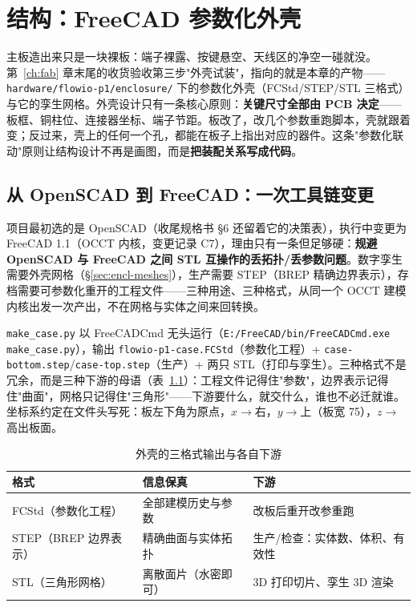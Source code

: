 \chapter{结构：FreeCAD 参数化外壳}
\label{ch:enclosure}

主板造出来只是一块裸板：端子裸露、按键悬空、天线区的净空一碰就没。第~\ref{ch:fab} 章末尾的收货验收第三步"外壳试装"，指向的就是本章的产物——\texttt{hardware/flowio-p1/enclosure/} 下的参数化外壳（FCStd/STEP/STL 三格式）与它的孪生网格。外壳设计只有一条核心原则：\textbf{关键尺寸全部由 PCB 决定}——板框、铜柱位、连接器坐标、端子节距。板改了，改几个参数重跑脚本，壳就跟着变；反过来，壳上的任何一个孔，都能在板子上指出对应的器件。这条"参数化联动"原则让结构设计不再是画图，而是\textbf{把装配关系写成代码}。

\section{从 OpenSCAD 到 FreeCAD：一次工具链变更}
\label{sec:encl-freecad}

项目最初选的是 OpenSCAD（收尾规格书 \S6 还留着它的决策表），执行中变更为 FreeCAD 1.1（OCCT 内核，变更记录 C7），理由只有一条但足够硬：\textbf{规避 OpenSCAD 与 FreeCAD 之间 STL 互操作的丢拓扑/丢参数问题}。数字孪生需要外壳网格（\S\ref{sec:encl-meshes}），生产需要 STEP（BREP 精确边界表示），存档需要可参数化重开的工程文件——三种用途、三种格式，从同一个 OCCT 建模内核出发一次产出，不在网格与实体之间来回转换。

\texttt{make\_case.py} 以 FreeCADCmd 无头运行（\texttt{E:/FreeCAD/bin/FreeCADCmd.exe make\_case.py}），输出 \texttt{flowio-p1-case.FCStd}（参数化工程）+ \texttt{case-bottom.step}/\texttt{case-top.step}（生产）+ 两只 STL（打印与孪生）。三种格式不是冗余，而是三种下游的母语（表~\ref{tab:encl-formats}）：工程文件记得住"参数"，边界表示记得住"曲面"，网格只记得住"三角形"——下游要什么，就交什么，谁也不必迁就谁。坐标系约定在文件头写死：板左下角为原点，$x\to$右，$y\to$上（板宽 75），$z\to$高出板面。

\begin{table}[htbp]
  \centering
  \caption{外壳的三格式输出与各自下游}
  \label{tab:encl-formats}
  \begin{tabular}{llp{4.4cm}}
    \toprule
    格式 & 信息保真 & 下游 \\
    \midrule
    FCStd（参数化工程） & 全部建模历史与参数 & 改板后重开改参重跑 \\
    STEP（BREP 边界表示） & 精确曲面与实体拓扑 & 生产/检查：实体数、体积、有效性 \\
    STL（三角形网格） & 离散面片（水密即可） & 3D 打印切片、孪生 3D 渲染 \\
    \bottomrule
  \end{tabular}
\end{table}

